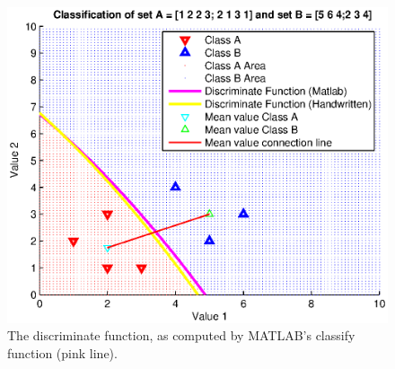 \documentclass[subfigure,epsfig,fleqn,amssmb,float,caption,ausarbeitung]{scrartcl}
\begin{document}
\begin{figure}
	\centering
        \includegraphics[width=14cm]{img/discriminantFunctionPlot.eps}
	\caption{The discriminate function, as computed by MATLAB's classify function (pink line).}
	\label{fig:disfunplot}
\end{figure}


\pagebreak


\fontsize{9}{10pt}


\end{document}
